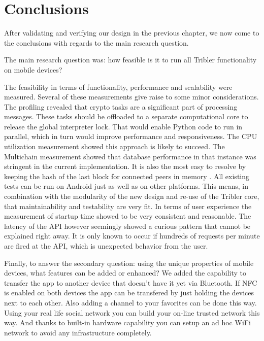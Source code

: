 \chapter{Conclusions}
After validating and verifying our design in the previous chapter, we now come to the conclusions with regards to the main research question.

The main research question was: how feasible is it to run all Tribler functionality on mobile devices? %

The feasibility in terms of functionality, performance and scalability were measured.
Several of these measurements give raise to some minor considerations.
The profiling revealed that crypto tasks are a significant part of processing messages.
These tasks should be offloaded to a separate computational core to release the global interpreter lock.
That would enable Python code to run in parallel, which in turn would improve performance and responsiveness.
The CPU utilization measurement showed this approach is likely to succeed.
The Multichain measurement showed that database performance in that instance was stringent in the current implementation.
It is also the most easy to resolve by keeping the hash of the last block for connected peers in memory .
All existing tests can be run on Android just as well as on other platforms.
This means, in combination with the modularity of the new design and re-use of the Tribler core, that maintainability and testability are very fit.
In terms of user experience the measurement of startup time showed to be very consistent and reasonable.
The latency of the API however seemingly showed a curious pattern that cannot be explained right away.
It is only known to occur if hundreds of requests per minute are fired at the API, which is unexpected behavior from the user.

Finally, to answer the secondary question: using the unique properties of mobile devices, what features can be added or enhanced?
We added the capability to transfer the app to another device that doesn't have it yet via Bluetooth.
If NFC is enabled on both devices the app can be transfered by just holding the devices next to each other.
Also adding a channel to your favorites can be done this way.
Using your real life social network you can build your on-line trusted network this way.
And thanks to built-in hardware capability you can setup an ad hoc WiFi network to avoid any infrastructure completely.



